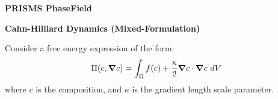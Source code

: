 \documentclass[10pt]{article}
\newcommand{\gv}[1]{\ensuremath{\mbox{\boldmath$ #1 $}}}
\newcommand{\grad}[1]{\gv{\nabla} #1}
\begin{document}
\def\Bomega{\mbox{\boldmath$\omega$}}
\def\Bvarepsilon{\mbox{\boldmath$\varepsilon$}}
\def\Bvartheta{\mbox{\boldmath$\vartheta$}}
\def\Bvarpi{\mbox{\boldmath$\varpi$}}
\def\Bvarrho{\mbox{\boldmath$\varrho$}}
\def\Bvarsigma{\mbox{\boldmath$\varsigma$}}
\def\Bvarphi{\mbox{\boldmath$\varphi$}}
\def\bone{\mathbf{1}}
\def\bzero{\mathbf{0}}
\def\bA{\mbox{\boldmath$ A$}}
\def\bB{\mbox{\boldmath$ B$}}
\def\bC{\mbox{\boldmath$ C$}}
\def\bD{\mbox{\boldmath$ D$}}
\def\bE{\mbox{\boldmath$ E$}}
\def\bF{\mbox{\boldmath$ F$}}
\def\bG{\mbox{\boldmath$ G$}}
\def\bH{\mbox{\boldmath$ H$}}
\def\bI{\mbox{\boldmath$ I$}}
\def\bJ{\mbox{\boldmath$ J$}}
\def\bK{\mbox{\boldmath$ K$}}
\def\bL{\mbox{\boldmath$ L$}}
\def\bM{\mbox{\boldmath$ M$}}
\def\bN{\mbox{\boldmath$ N$}}
\def\bO{\mbox{\boldmath$ O$}}
\def\bP{\mbox{\boldmath$ P$}}
\def\bQ{\mbox{\boldmath$ Q$}}
\def\bR{\mbox{\boldmath$ R$}}
\def\bS{\mbox{\boldmath$ S$}}
\def\bT{\mbox{\boldmath$ T$}}
\def\bU{\mbox{\boldmath$ U$}}
\def\bV{\mbox{\boldmath$ V$}}
\def\bW{\mbox{\boldmath$ W$}}
\def\bX{\mbox{\boldmath$ X$}}
\def\bY{\mbox{\boldmath$ Y$}}
\def\bZ{\mbox{\boldmath$ Z$}}
\def\ba{\mbox{\boldmath$ a$}}
\def\bb{\mbox{\boldmath$ b$}}
\def\bc{\mbox{\boldmath$ c$}}
\def\bd{\mbox{\boldmath$ d$}}
\def\be{\mbox{\boldmath$ e$}}
\def\bff{\mbox{\boldmath$ f$}}
\def\bg{\mbox{\boldmath$ g$}}
\def\bh{\mbox{\boldmath$ h$}}
\def\bi{\mbox{\boldmath$ i$}}
\def\bj{\mbox{\boldmath$ j$}}
\def\bk{\mbox{\boldmath$ k$}}
\def\bl{\mbox{\boldmath$ l$}}
\def\bm{\mbox{\boldmath$ m$}}
\def\bn{\mbox{\boldmath$ n$}}
\def\bo{\mbox{\boldmath$ o$}}
\def\bp{\mbox{\boldmath$ p$}}
\def\bq{\mbox{\boldmath$ q$}}
\def\br{\mbox{\boldmath$ r$}}
\def\bs{\mbox{\boldmath$ s$}}
\def\bt{\mbox{\boldmath$ t$}}
\def\bu{\mbox{\boldmath$ u$}}
\def\bv{\mbox{\boldmath$ v$}}
\def\bw{\mbox{\boldmath$ w$}}
\def\bx{\mbox{\boldmath$ x$}}
\def\by{\mbox{\boldmath$ y$}}
\def\bz{\mbox{\boldmath$ z$}}
\centerline{\Large{\bf PRISMS PhaseField}}
\smallskip
\centerline{\Large{\bf Cahn-Hilliard Dynamics (Mixed-Formulation)}}
\bigskip
Consider a free energy expression of the form:
\begin{equation}
  \Pi(c, \grad  c) = \int_{\Omega}    f( c ) + \frac{\kappa}{2} \grad  c  \cdot \grad  c    ~dV 
\end{equation}
where $c$ is the composition, and $\kappa$ is the gradient length scale parameter.
	
\end{document}
